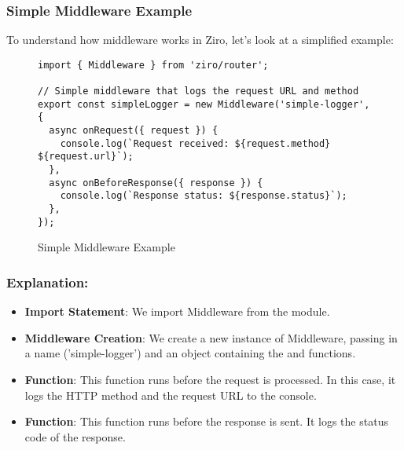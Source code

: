 \subsubsection*{Simple Middleware Example}
To understand how middleware works in Ziro, let’s look at a simplified example:
\begin{figure}[h!]
\begin{verbatim}
import { Middleware } from 'ziro/router';

// Simple middleware that logs the request URL and method
export const simpleLogger = new Middleware('simple-logger', {
  async onRequest({ request }) {
    console.log(`Request received: ${request.method} ${request.url}`);
  },
  async onBeforeResponse({ response }) {
    console.log(`Response status: ${response.status}`);
  },
});
\end{verbatim}
\caption{Simple Middleware Example}
\end{figure}

\subsubsection*{Explanation:}

\begin{itemize}
  \item \textbf{Import Statement}: We import Middleware from the  module.
  \item \textbf{Middleware Creation}: We create a new instance of Middleware, passing in a name ('simple-logger') and an object containing the  and  functions.
  \item \textbf{ Function}: This function runs before the request is processed. In this case, it logs the HTTP method and the request URL to the console.
  \item \textbf{ Function}: This function runs before the response is sent. It logs the status code of the response.
\end{itemize}

